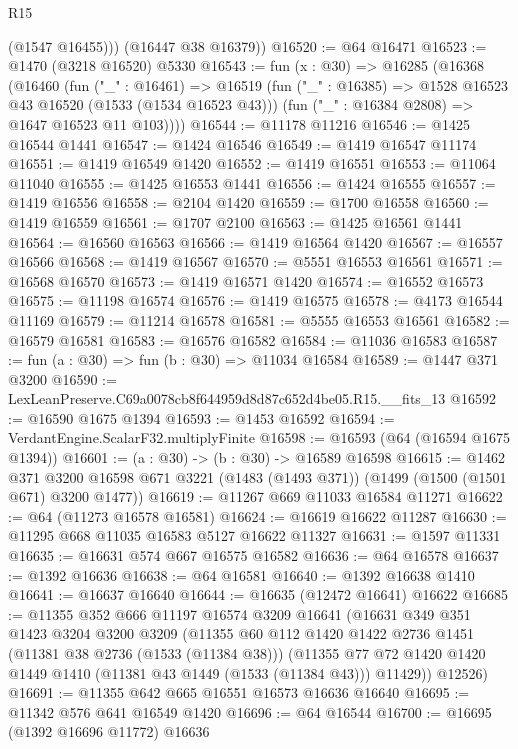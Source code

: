 \begin{lexlean}{R15}
\begin{coremodule}
          (@1547 @16455)))
      (@16447 @38 @16379))
@16520 := @64 @16471
@16523 := @1470 (@3218 @16520) @5330
@16543 := fun (x : @30) =>
  @16285
    (@16368
      (@16460
        (fun ("_" : @16461) =>
        @16519
          (fun ("_" : @16385) => @1528 @16523 @43 @16520 (@1533 (@1534 @16523 @43)))
          (fun ("_" : @16384 @2808) => @1647 @16523 @11 @103))))
@16544 := @11178 @11216
@16546 := @1425 @16544 @1441
@16547 := @1424 @16546
@16549 := @1419 @16547 @11174
@16551 := @1419 @16549 @1420
@16552 := @1419 @16551
@16553 := @11064 @11040
@16555 := @1425 @16553 @1441
@16556 := @1424 @16555
@16557 := @1419 @16556
@16558 := @2104 @1420
@16559 := @1700 @16558
@16560 := @1419 @16559
@16561 := @1707 @2100
@16563 := @1425 @16561 @1441
@16564 := @16560 @16563
@16566 := @1419 @16564 @1420
@16567 := @16557 @16566
@16568 := @1419 @16567
@16570 := @5551 @16553 @16561
@16571 := @16568 @16570
@16573 := @1419 @16571 @1420
@16574 := @16552 @16573
@16575 := @11198 @16574
@16576 := @1419 @16575
@16578 := @4173 @16544 @11169
@16579 := @11214 @16578
@16581 := @5555 @16553 @16561
@16582 := @16579 @16581
@16583 := @16576 @16582
@16584 := @11036 @16583
@16587 := fun (a : @30) => fun (b : @30) => @11034 @16584
@16589 := @1447 @371 @3200
@16590 := LexLeanPreserve.C69a0078cb8f644959d8d87c652d4be05.R15.__fits_13
@16592 := @16590 @1675 @1394
@16593 := @1453 @16592
@16594 := VerdantEngine.ScalarF32.multiplyFinite
@16598 := @16593 (@64 (@16594 @1675 @1394))
@16601 := (a : @30) -> (b : @30) -> @16589 @16598
@16615 := @1462
    @371
    @3200
    @16598
    @671
    @3221
    (@1483 (@1493 @371))
    (@1499 (@1500 (@1501 @671) @3200 @1477))
@16619 := @11267 @669 @11033 @16584 @11271
@16622 := @64 (@11273 @16578 @16581)
@16624 := @16619 @16622 @11287
@16630 := @11295 @668 @11035 @16583 @5127 @16622 @11327
@16631 := @1597 @11331
@16635 := @16631 @574 @667 @16575 @16582
@16636 := @64 @16578
@16637 := @1392 @16636
@16638 := @64 @16581
@16640 := @1392 @16638 @1410
@16641 := @16637 @16640
@16644 := @16635 (@12472 @16641) @16622
@16685 := @11355
    @352
    @666
    @11197
    @16574
    @3209
    @16641
    (@16631
      @349
      @351
      @1423
      @3204
      @3200
      @3209
      (@11355
        @60
        @112
        @1420
        @1422
        @2736
        @1451
        (@11381 @38 @2736 (@1533 (@11384 @38)))
        (@11355 @77 @72 @1420 @1420 @1449 @1410 (@11381 @43 @1449 (@1533 (@11384 @43))) @11429))
      @12526)
@16691 := @11355 @642 @665 @16551 @16573 @16636 @16640
@16695 := @11342 @576 @641 @16549 @1420
@16696 := @64 @16544
@16700 := @16695 (@1392 @16696 @11772) @16636

\end{coremodule}
\end{lexlean}
